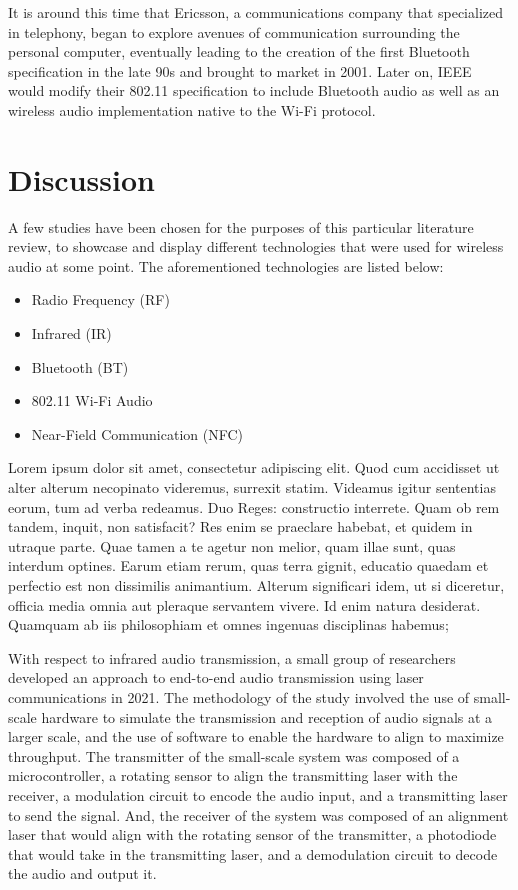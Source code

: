 \documentclass[conference]{IEEEtran}
\begin{document}
It is around this time that Ericsson, a communications company that specialized in telephony,
began to explore avenues of communication surrounding the personal computer, eventually
leading to the creation of the first Bluetooth specification in the late 90s and brought to
market in 2001.\cite{irekvist_bluetooth_2022} Later on, IEEE would modify their 802.11
specification to include Bluetooth audio as well as an wireless audio implementation native
to the Wi-Fi protocol.\cite{noauthor_bluetooth_nodate}

\section*{Discussion}

A few studies have been chosen for the purposes of this particular literature review, to
showcase and display different technologies that were used for wireless audio at some point.
The aforementioned technologies are listed below:

\begin{itemize}
    \item Radio Frequency (RF)
    \item Infrared (IR)
    \item Bluetooth (BT)
    \item 802.11 Wi-Fi Audio
    \item Near-Field Communication (NFC)
\end{itemize}

Lorem ipsum dolor sit amet, consectetur adipiscing elit. Quod cum accidisset ut alter alterum
necopinato videremus, surrexit statim. Videamus igitur sententias eorum, tum ad verba
redeamus. Duo Reges: constructio interrete. Quam ob rem tandem, inquit, non satisfacit? Res
enim se praeclare habebat, et quidem in utraque parte. Quae tamen a te agetur non melior,
quam illae sunt, quas interdum optines. Earum etiam rerum, quas terra gignit, educatio
quaedam et perfectio est non dissimilis animantium. Alterum significari idem, ut si
diceretur, officia media omnia aut pleraque servantem vivere. Id enim natura desiderat.
Quamquam ab iis philosophiam et omnes ingenuas disciplinas habemus;

With respect to infrared audio transmission, a small group of researchers developed an
approach to end-to-end audio transmission using laser communications in 2021. The methodology
of the study involved the use of small-scale hardware to simulate the transmission and
reception of audio signals at a larger scale, and the use of software to enable the hardware
to align to maximize throughput. The transmitter of the small-scale system was composed of a
microcontroller, a rotating sensor to align the transmitting laser with the receiver, a
modulation circuit to encode the audio input, and a transmitting laser to send the signal.
And, the receiver of the system was composed of an alignment laser that would align with the
rotating sensor of the transmitter,  a photodiode that would take in the transmitting laser,
and a demodulation circuit to decode the audio and output it.\cite{anthony_approach_2021}
\end{document}

